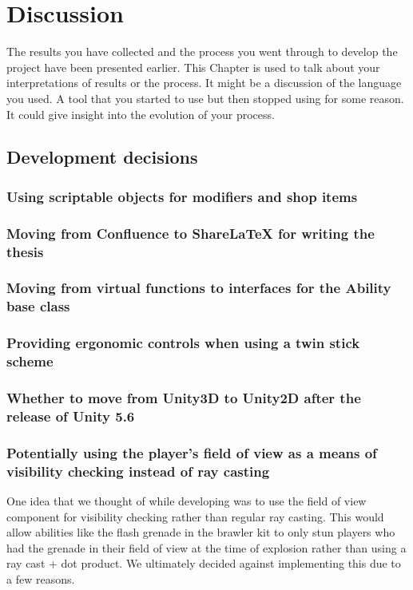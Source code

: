 \chapter{Discussion}
\label{chap:discussion}

The results you have collected and the process you went through to develop the project have been presented earlier.  This Chapter is used to talk about your interpretations of results or the process.  It might be a discussion of the language you used.  A tool that you started to use but then stopped using for some reason.  It could give insight into the evolution of your process.

\section{Development decisions}
\subsection{Using scriptable objects for modifiers and shop items}
\subsection{Moving from Confluence to ShareLaTeX for writing the thesis}
\subsection{Moving from virtual functions to interfaces for the Ability base class}
\subsection{Providing ergonomic controls when using a twin stick scheme}
\subsection{Whether to move from Unity3D to Unity2D after the release of Unity 5.6}

\subsection{Potentially using the player's field of view as a means of visibility checking instead of ray casting}
One idea that we thought of while developing was to use the field of view component for visibility checking rather than regular ray casting. This would allow abilities like the flash grenade in the brawler kit to only stun players who had the grenade in their field of view at the time of explosion rather than using a ray cast + dot product. We ultimately decided against implementing this due to a few reasons. 

